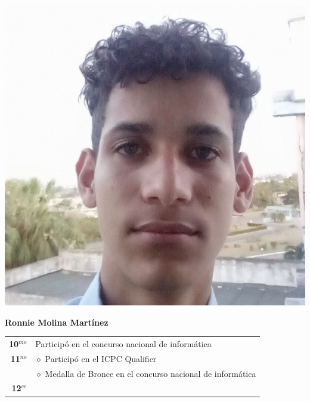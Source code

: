 \begin{minipage}{0.2\textwidth}
	\includegraphics[width=\linewidth]{img/concursantes/ronnie.png} %
\end{minipage}
\hfill
\begin{minipage}{0.7\textwidth}
	\textbf{Ronnie Molina Martínez}
	
	\vspace*{0.1in}
	\begin{tabular}{rl}
		
		\textbf{10$^{mo}$} &  Participó en el concurso nacional de informática \\
		
		\textbf{11$^{no}$} 
		& $\diamond$ Participó en el ICPC Qualifier \\
		& $\diamond$ Medalla de Bronce en el concurso nacional de informática \\
		
		
		\textbf{12$^{ce}$} &   \\
		
	\end{tabular}
\end{minipage}


